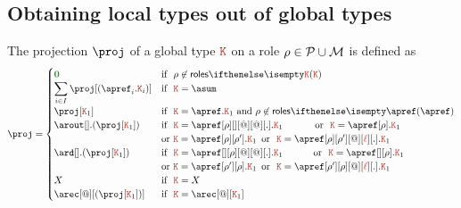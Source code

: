 \subsection{Obtaining local types out of global types}
The projection $\proj$ of a global type $\aK$ on a role
$\rho \in \mathcal{P} \cup \mathcal{M}$ is defined as
\[
  \proj =
  \begin{cases}
    \nil & \text{if }\ \arole \not \in \roles \aK
    \\
    \displaystyle{\sum_{i\in I}{\proj[(\apref_i.\aK_i)]}}
    &
    \text{if }\ \aK = \asum
    \\
    \proj[\aK_1]
    &
    \text{if }\ \aK = \apref.\aK_1 \text{ and } \rho\not\in\roles{\apref}
    \\
    \arout[].(\proj[\aK_1])
    &
    \text{if }\  \aK = \apref[\arole][{}][@][@][.].\aK_1 \qquad\quad \text{ or }\ \aK = \apref[\arole].\aK_1    \\
    & \text{or } \aK = \apref[\arole][\arole'].\aK_1\, \text{ or }\ \aK = \apref[\arole][\arole'][@][\alocvar][.].\aK_1
    \\
    \ard[].(\proj[\aK_1])
    &
    \text{if }\  \aK = \apref[{}][\arole][@][@][.].\aK_1 \qquad\quad\! \text{ or }\ \aK = \apref[{}][\arole].\aK_1\\ 
    & \text{or } \aK = \apref[\arole'][\arole].\aK_1\, \text{ or }\ \aK = \apref[\arole'][\arole][@][\alocvar][.].\aK_1
    \\
    X
    & \text{if }\ \aK = X
    \\
    \arec[@][{(\proj[\aK_1])}]
    &
    \text{if }\ \aK = \arec[@][\aK_1]
  \end{cases}
\]


